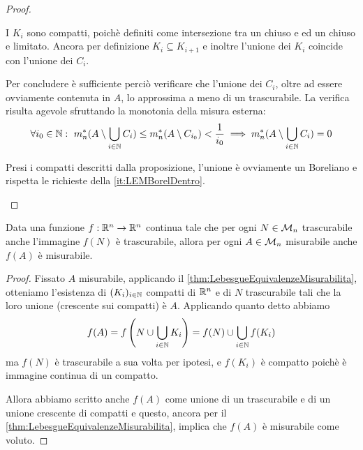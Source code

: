 \begin{proof}
\begin{description}
		I $K_i$ sono compatti, poichè definiti come intersezione tra un chiuso e ed un chiuso e limitato. 
		Ancora per definizione $K_i\subseteq K_{i+1}$ e inoltre l'unione dei $K_i$ coincide con l'unione dei $C_i$.
		
		Per concludere è sufficiente perciò verificare che l'unione dei $C_i$, oltre ad essere ovviamente contenuta in $A$, lo approssima a meno di un trascurabile.
		La verifica risulta agevole sfruttando la monotonia della misura esterna:
		\begin{equation*}
			\forall i_0\in\mathbb N:\ m_n^*(A\setminus \bigcup_{i\in\mathbb N} C_i)\le m_n^*(A\setminus C_{i_0})< \frac 1{i_0}\implies m_n^*(A\setminus \bigcup_{i\in\mathbb N} C_i)=0
		\end{equation*}

		\item[\ImplicationProof{it:LEMCompattiDentro}{it:LEMBorelDentro}] Presi i compatti descritti dalla proposizione, l'unione è ovviamente un Boreliano e rispetta le richieste della \ref{it:LEMBorelDentro}.
	\end{description}

\end{proof}

\begin{proposition}\label{prop:ContinueSpecialiTengonoMisurabili}
	Data una funzione $f:\mathbb R^n\to\mathbb R^n$ continua tale che per ogni $N\in\mathcal M_n$ trascurabile anche l'immagine $f(N)$ è trascurabile, allora per ogni $A\in\mathcal M_n$ misurabile anche $f(A)$ è misurabile.
\end{proposition}
\begin{proof}
	Fissato $A$ misurabile, applicando il \cref{thm:LebesgueEquivalenzeMisurabilita}, otteniamo l'esistenza di $(K_i)_{i\in\mathbb N}$ compatti di $\mathbb R^n$ e di $N$ trascurabile tali che la loro unione (crescente sui compatti) è $A$. Applicando quanto detto abbiamo
	\begin{equation*}
		f(A)=f\left(N\cup\bigcup_{i\in\mathbb N}K_i\right)=f(N)\cup\bigcup_{i\in\mathbb N}f(K_i)
	\end{equation*}
	ma $f(N)$ è trascurabile a sua volta per ipotesi, e $f(K_i)$ è compatto poichè è immagine continua di un compatto.
	
	Allora abbiamo scritto anche $f(A)$ come unione di un trascurabile e di un unione crescente di compatti e questo, ancora per il \cref{thm:LebesgueEquivalenzeMisurabilita}, implica che $f(A)$ è misurabile come voluto.
\end{proof}


